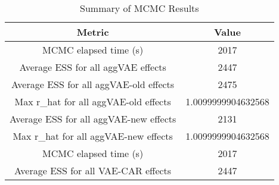 
\begin{table}[h!]
\centering
\begin{tabular}{|c|c|}
\hline
\textbf{Metric} & \textbf{Value} \\
\hline
MCMC elapsed time (s) & 2017 \\
\hline
Average ESS for all aggVAE effects & 2447 \\
\hline
Average ESS for all aggVAE-old effects & 2475 \\
\hline
Max r\_hat for all aggVAE-old effects & 1.0099999904632568 \\
\hline
Average ESS for all aggVAE-new effects & 2131 \\
\hline
Max r\_hat for all aggVAE-new effects & 1.0099999904632568 \\
\hline
MCMC elapsed time (s) & 2017 \\
\hline
Average ESS for all VAE-CAR effects & 2447 \\
\hline
\end{tabular}
\caption{Summary of MCMC Results}
\label{table:mcmc_summary}
\end{table}
